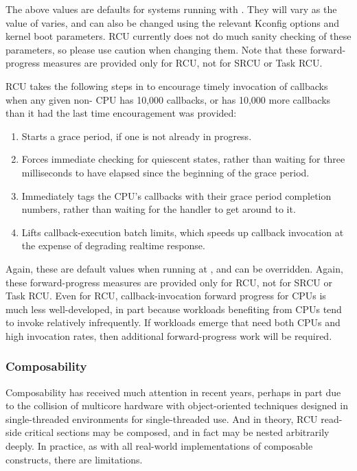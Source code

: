 The above values are defaults for systems running with .
They
will vary as the value of  varies, and can also be changed using
the relevant Kconfig options and kernel boot parameters.
RCU currently
does not do much sanity checking of these parameters, so please use
caution when changing them.
Note that these forward-progress measures
are provided only for RCU, not for SRCU %
or Task RCU\@. %

RCU takes the following steps in  to encourage timely
invocation of callbacks when any given non- CPU has
10,000 callbacks, or has 10,000 more callbacks than it had the last time
encouragement was provided:

\begin{enumerate}
\item Starts a grace period, if one is not already in progress.
\item Forces immediate checking for quiescent states, rather than waiting
   for three milliseconds to have elapsed since the beginning of the
   grace period.
\item Immediately tags the CPU's callbacks with their grace period
   completion numbers, rather than waiting for the 
   handler to get around to it.
\item Lifts callback-execution batch limits, which speeds up callback
   invocation at the expense of degrading realtime response.
\end{enumerate}

Again, these are default values when running at , and can be
overridden.
Again, these forward-progress measures are provided only for
RCU, not for SRCU %
or Task RCU. %
Even for RCU, callback-invocation forward
progress for  CPUs is much less well-developed, in part
because workloads benefiting from  CPUs tend to invoke
 relatively infrequently.
If workloads emerge that need
both  CPUs and high  invocation rates, then
additional forward-progress work will be required.


\subsubsection{Composability}

Composability has received much attention in recent years, perhaps in
part due to the collision of multicore hardware with object-oriented
techniques designed in single-threaded environments for single-threaded
use.
And in theory, RCU read-side critical sections may be composed, and
in fact may be nested arbitrarily deeply.
In practice, as with all
real-world implementations of composable constructs, there are
limitations.

